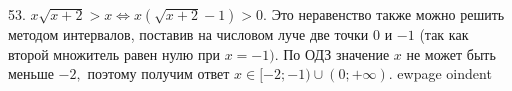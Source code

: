 53. $x\sqrt{x+2}>x\Leftrightarrow x(\sqrt{x+2}-1)>0.$ Это неравенство также можно решить методом интервалов, поставив на числовом луче две точки 0 и $-1$ (так как второй множитель равен нулю при  $x=-1).$ По ОДЗ значение $x$ не может быть меньше $-2,$ поэтому получим ответ $x\in[-2;-1)\cup(0;+\infty).$
ewpage
oindent
